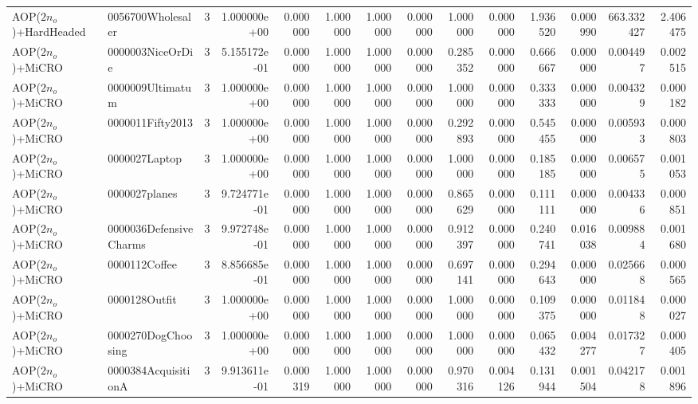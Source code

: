 \begin{tabular}{llrr|r|rr|rr|rr|rrr}
  AOP($2 n_o$)+HardHeaded &      0056700Wholesaler &       3 & 1.000000e+00 & 0.000000 & 1.000000 &      1.000000 & 0.000000 &      1.000000 & 0.000000 &      1.936520 &    0.000990 &   663.332427 &    2.406475 \\
       AOP($2 n_o$)+MiCRO &       0000003NiceOrDie &       3 & 5.155172e-01 & 0.000000 & 1.000000 &      1.000000 & 0.000000 &      0.285352 & 0.000000 &      0.666667 &    0.000000 &     0.004497 &    0.002515 \\
       AOP($2 n_o$)+MiCRO &       0000009Ultimatum &       3 & 1.000000e+00 & 0.000000 & 1.000000 &      1.000000 & 0.000000 &      1.000000 & 0.000000 &      0.333333 &    0.000000 &     0.004329 &    0.000182 \\
       AOP($2 n_o$)+MiCRO &       0000011Fifty2013 &       3 & 1.000000e+00 & 0.000000 & 1.000000 &      1.000000 & 0.000000 &      0.292893 & 0.000000 &      0.545455 &    0.000000 &     0.005933 &    0.000803 \\
       AOP($2 n_o$)+MiCRO &          0000027Laptop &       3 & 1.000000e+00 & 0.000000 & 1.000000 &      1.000000 & 0.000000 &      1.000000 & 0.000000 &      0.185185 &    0.000000 &     0.006575 &    0.001053 \\
       AOP($2 n_o$)+MiCRO &          0000027planes &       3 & 9.724771e-01 & 0.000000 & 1.000000 &      1.000000 & 0.000000 &      0.865629 & 0.000000 &      0.111111 &    0.000000 &     0.004336 &    0.000851 \\
       AOP($2 n_o$)+MiCRO & 0000036DefensiveCharms &       3 & 9.972748e-01 & 0.000000 & 1.000000 &      1.000000 & 0.000000 &      0.912397 & 0.000000 &      0.240741 &    0.016038 &     0.009884 &    0.001680 \\
       AOP($2 n_o$)+MiCRO &          0000112Coffee &       3 & 8.856685e-01 & 0.000000 & 1.000000 &      1.000000 & 0.000000 &      0.697141 & 0.000000 &      0.294643 &    0.000000 &     0.025668 &    0.000565 \\
       AOP($2 n_o$)+MiCRO &          0000128Outfit &       3 & 1.000000e+00 & 0.000000 & 1.000000 &      1.000000 & 0.000000 &      1.000000 & 0.000000 &      0.109375 &    0.000000 &     0.011848 &    0.000027 \\
       AOP($2 n_o$)+MiCRO &     0000270DogChoosing &       3 & 1.000000e+00 & 0.000000 & 1.000000 &      1.000000 & 0.000000 &      1.000000 & 0.000000 &      0.065432 &    0.004277 &     0.017327 &    0.000405 \\
       AOP($2 n_o$)+MiCRO &    0000384AcquisitionA &       3 & 9.913611e-01 & 0.000319 & 1.000000 &      1.000000 & 0.000000 &      0.970316 & 0.004126 &      0.131944 &    0.001504 &     0.042178 &    0.001896 \\

\end{tabular}
